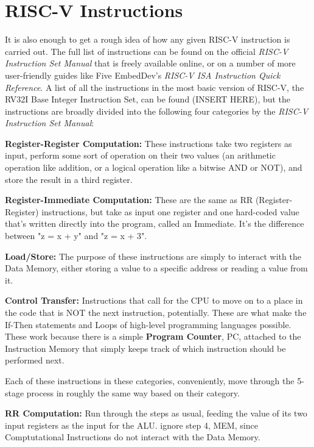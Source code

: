 \documentclass[12pt,twoside]{reedthesis}
\begin{document}
\section{RISC-V Instructions}

It is also enough to get a rough idea of how any given RISC-V instruction is carried out. The full list of instructions can be found on the official \textit{RISC-V Instruction Set Manual} that is freely available online, or on a number of more user-friendly guides like Five EmbedDev's \textit{RISC-V ISA Instruction Quick Reference}. A list of all the instructions in the most basic version of RISC-V, the RV32I Base Integer Instruction Set, can be found (INSERT HERE), but the instructions are broadly divided into the following four categories by the \textit{RISC-V Instruction Set Manual}:


\textbf{Register-Register Computation:} These instructions take two registers as input, perform some sort of operation on their two values (an arithmetic operation like addition, or a logical operation like a bitwise AND or NOT), and store the result in a third register.

\textbf{Register-Immediate Computation:} These are the same as RR (Register-Register) instructions, but take as input one register and one hard-coded value that's written directly into the program, called an Immediate. It's the difference between "z = x + y" and "z = x + 3".

\textbf{Load/Store:} The purpose of these instructions are simply to interact with the Data Memory, either storing a value to a specific address or reading a value from it.

\textbf{Control Transfer:} Instructions that call for the CPU to move on to a place in the code that is NOT the next instruction, potentially. These are what make the If-Then statements and Loops of high-level programming languages possible. These work because there is a simple \textbf{Program Counter}, PC, attached to the Instruction Memory that simply keeps track of which instruction should be performed next.

Each of these instructions in these categories, conveniently, move through the 5-stage process in roughly the same way based on their category.

\textbf{RR Computation:} Run through the steps as usual, feeding the value of its two input registers as the input for the ALU. ignore step 4, MEM, since Comptutational Instructions do not interact with the Data Memory.
\end{document}
